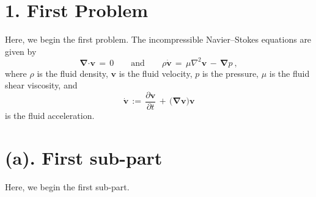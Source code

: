 \documentclass[11pt]{article}
\newcommand{\bmcdot}{\bm{\cdot}}
\newcommand{\bmnabla}{\bm{\nabla}}
\newcommand{\bmv}{\bm{v}}
\newcommand{\bmvdot}{\bm{\dot{v}}}
\begin{document}
%
%

\section*{1. First Problem}

Here, we begin the first problem.
The incompressible Navier--Stokes equations are given by
\begin{equation}
	\bmnabla \bmcdot \bmv
	\, = \, 0
	\qquad
	\text{and}
	\qquad
	\rho \bmvdot
	\, = \, \mu \nabla^2 \bmv
	\, - \, \bmnabla p
	~,
\end{equation}
where $\rho$ is the fluid density, $\bmv$ is the fluid velocity, $p$ is the pressure, $\mu$ is the fluid shear viscosity, and 
\begin{equation}
	\bmvdot
	\, := \, \dfrac{\partial \bmv}{\partial t}
	\, + \, \big( \bmnabla \bmv \big) \bmv
\end{equation}
is the fluid acceleration.



%
%

\section*{(a). First sub-part}

Here, we begin the first sub-part.
\end{document}
